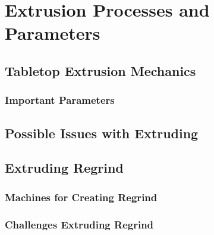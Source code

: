 \section{Extrusion Processes and Parameters\label{sec:literatureReview:extrusion}}

\subsection{Tabletop Extrusion Mechanics\label{sec:literatureReview:extrusion:mechanics}}

\subsubsection{Important Parameters\label{sec:literatureReview:extrusion:mechanics:parameters}}

\subsection{Possible Issues with Extruding\label{sec:literatureReview:extrusion:issues}}

\subsection{Extruding Regrind\label{sec:literatureReview:extrusion:regrind}}

\subsubsection{Machines for Creating Regrind\label{sec:literatureReview:extrusion:regrind:machines}}

\subsubsection{Challenges Extruding Regrind\label{sec:literatureReview:extrusion:regrind:challenges}}


